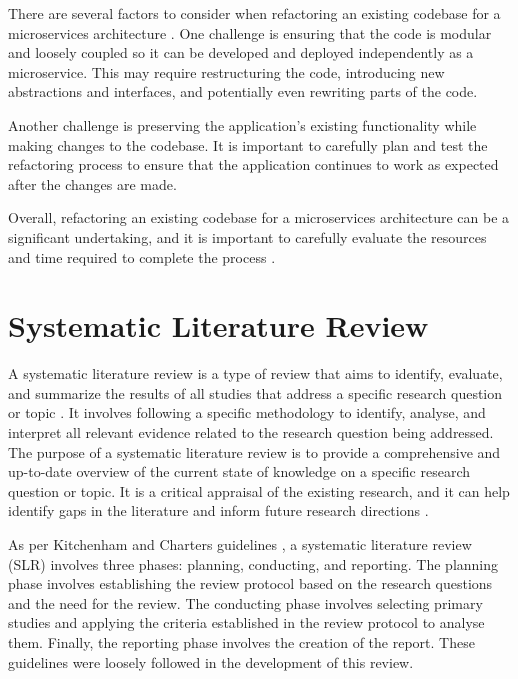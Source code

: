 \documentclass[conference]{IEEEtran}
\begin{document}
There are several factors to consider when refactoring an existing codebase for
a microservices architecture \cite{newman2019monolith}. One challenge is
ensuring that the code is modular and loosely coupled so it can be developed
and deployed independently as a microservice. This may require restructuring
the code, introducing new abstractions and interfaces, and potentially even
rewriting parts of the code.

Another challenge is preserving the application's existing functionality while
making changes to the codebase. It is important to carefully plan and test the
refactoring process to ensure that the application continues to work as
expected after the changes are made.

Overall, refactoring an existing codebase for a microservices architecture can
be a significant undertaking, and it is important to carefully evaluate the
resources and time required to complete the process \cite{newman2019monolith}.

\section{Systematic Literature Review}

A systematic literature review is a type of review that aims to identify,
evaluate, and summarize the results of all studies that address a specific
research question or topic
\cite{kitchenham2007guidelines,kitchenham2009systematic,gough2017introduction}.
It involves following a specific methodology to identify, analyse, and
interpret all relevant evidence related to the research question being
addressed. The purpose of a systematic literature review is to provide a
comprehensive and up-to-date overview of the current state of knowledge on a
specific research question or topic. It is a critical appraisal of the existing
research, and it can help identify gaps in the literature and inform future
research directions \cite{kitchenham2007guidelines}.

As per Kitchenham and Charters guidelines \cite{kitchenham2007guidelines}, a
systematic literature review (SLR) involves three phases: planning, conducting,
and reporting. The planning phase involves establishing the review protocol
based on the research questions and the need for the review. The conducting
phase involves selecting primary studies and applying the criteria established
in the review protocol to analyse them. Finally, the reporting phase involves
the creation of the report. These guidelines were loosely followed in the
development of this review.
\end{document}
